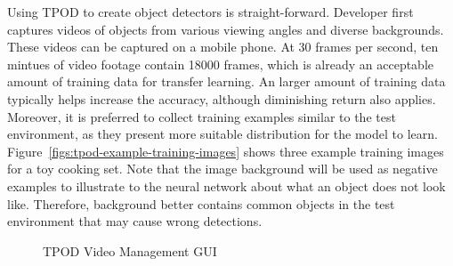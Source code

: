 Using TPOD to create object detectors is straight-forward. Developer first
captures videos of objects from various viewing angles and diverse backgrounds.
These videos can be captured on a mobile phone. At 30 frames per second, ten
mintues of video footage contain 18000 frames, which is already an acceptable
amount of training data for transfer learning. An larger amount of training data
typically helps increase the accuracy, although diminishing return also applies.
Moreover, it is preferred to collect training examples similar to the test
environment, as they present more suitable distribution for the model to learn.
Figure~\ref{figs:tpod-example-training-images} shows three example training
images for a toy cooking set. Note that the image background will be used as
negative examples to illustrate to the neural network about what an object does
not look like. Therefore, background better contains common objects in the test
environment that may cause wrong detections.


\begin{figure}[]
  \centering
    \caption{TPOD Video Management GUI}
  \label{figs:tpod-video-gui}
\end{figure}

